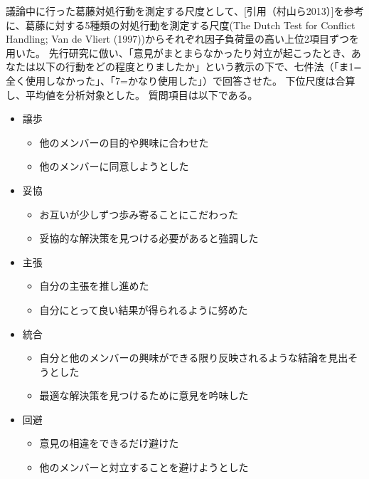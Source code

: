 \documentclass[11pt, a4paper]{jreport} %
\begin{document}
議論中に行った葛藤対処行動を測定する尺度として、[引用（村山ら2013）]を参考に、葛藤に対する5種類の対処行動を測定する尺度(The Dutch Test for Conflict Handling; Van de Vliert (1997))からそれぞれ因子負荷量の高い上位2項目ずつを用いた。
先行研究に倣い、「意見がまとまらなかったり対立が起こったとき、あなたは以下の行動をどの程度とりましたか」という教示の下で、七件法（「ま1=全く使用しなかった」、「7=かなり使用した」）で回答させた。
下位尺度は合算し、平均値を分析対象とした。
質問項目は以下である。
\begin{itemize}
\setlength{\parskip}{-0.1cm} %
  \setlength{\itemsep}{-0.1cm} %
\item 譲歩
\begin{itemize}
\setlength{\parskip}{-0.1cm} %
  \setlength{\itemsep}{-0.1cm} %
\item 他のメンバーの目的や興味に合わせた
\item 他のメンバーに同意しようとした
\end{itemize}

\item 妥協
\begin{itemize}
\setlength{\parskip}{-0.1cm} %
  \setlength{\itemsep}{-0.1cm} %
\item お互いが少しずつ歩み寄ることにこだわった
\item 妥協的な解決策を見つける必要があると強調した
\end{itemize}

\item 主張
\begin{itemize}
\setlength{\parskip}{-0.1cm} %
  \setlength{\itemsep}{-0.1cm} %
\item 自分の主張を推し進めた
\item 自分にとって良い結果が得られるように努めた
\end{itemize}

\item 統合
\begin{itemize}
\setlength{\parskip}{-0.1cm} %
  \setlength{\itemsep}{-0.1cm} %
\item 自分と他のメンバーの興味ができる限り反映されるような結論を見出そうとした
\item 最適な解決策を見つけるために意見を吟味した
\end{itemize}

\item 回避
\begin{itemize}
\setlength{\parskip}{-0.1cm} %
  \setlength{\itemsep}{-0.1cm} %
\item 意見の相違をできるだけ避けた
\item 他のメンバーと対立することを避けようとした
\end{itemize}

\end{itemize}
\end{document}

